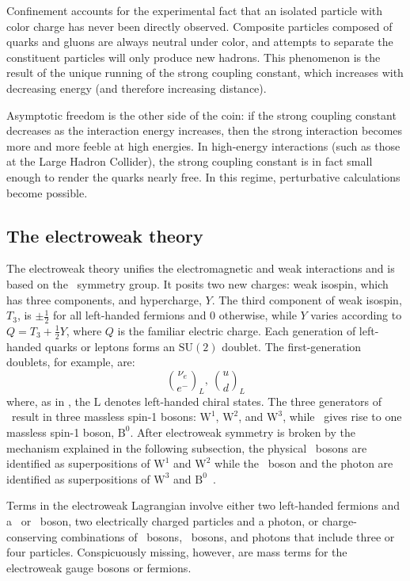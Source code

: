 Confinement accounts for the experimental fact that an isolated particle with color charge has never been directly observed. Composite particles composed of quarks and gluons are always neutral under color, and attempts to separate the constituent particles will only produce new hadrons. This phenomenon is the result of the unique running of the strong coupling constant, which increases with decreasing energy (and therefore increasing distance).

Asymptotic freedom is the other side of the coin: if the strong coupling constant decreases as the interaction energy increases, then the strong interaction becomes more and more feeble at high energies. In high-energy interactions (such as those at the Large Hadron Collider), the strong coupling constant is in fact small enough to render the quarks nearly free. In this regime, perturbative calculations become possible.

\subsection{The electroweak theory}
The electroweak theory unifies the electromagnetic and weak interactions and is based on the \ewsymm\ symmetry group. It posits two new charges: weak isospin, which has three components, and hypercharge, $Y$. The third component of weak isospin, $T_{3}$, is $\pm\frac{1}{2}$ for all left-handed fermions and 0 otherwise, while $Y$ varies according to $Q=T_{3}+\frac{1}{2}Y$, where $Q$ is the familiar electric charge. Each generation of left-handed quarks or leptons forms an $\mathrm{SU}(2)$ doublet. The first-generation doublets, for example, are:
\begin{equation}
    \binom{\nu_{e}}{e^{-}}_{L},\ \binom{u}{d}_{L}
\end{equation}
where, as in \sutwol, the $\mathrm{L}$ denotes left-handed chiral states. The three generators of \sutwol\ result in three massless spin-1 bosons: $\mathrm{W}^{1}$, $\mathrm{W}^{2}$, and $\mathrm{W}^{3}$, while \uoney\ gives rise to one massless spin-1 boson, $\mathrm{B}^{0}$. After electroweak symmetry is broken by the mechanism explained in the following subsection, the physical \PWpm\ bosons are identified as superpositions of $\mathrm{W}^{1}$ and $\mathrm{W}^{2}$ while the \cPZ\ boson and the photon are identified as superpositions of $\mathrm{W}^{3}$ and $\mathrm{B}^{0}$~\cite{weinberg_leptons}.

Terms in the electroweak Lagrangian involve either two left-handed fermions and a \PWpm\ or \cPZ\ boson, two electrically charged particles and a photon, or charge-conserving combinations of \PWpm\ bosons, \cPZ\ bosons, and photons that include three or four particles. Conspicuously missing, however, are mass terms for the electroweak gauge bosons or fermions.

